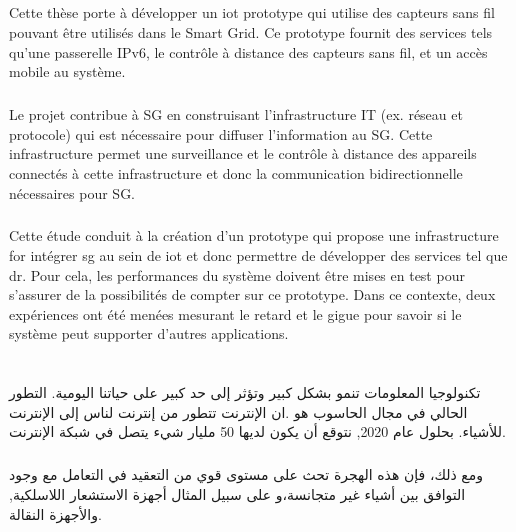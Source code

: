 \documentclass[12pt,a4paper,final]{report}
\begin{document}
\paragraph{} 
Cette thèse porte à développer un \gls{iot} prototype qui utilise des capteurs sans fil pouvant être utilisés dans le Smart Grid. Ce prototype fournit des services tels qu'une passerelle IPv6, le contrôle à distance des capteurs sans fil, et un accès mobile au système.
\paragraph{}
Le projet contribue à SG en construisant l'infrastructure IT (ex. réseau et protocole) qui est nécessaire pour diffuser l'information au SG. Cette infrastructure permet une surveillance et le contrôle à distance des appareils connectés à cette infrastructure et donc la communication bidirectionnelle nécessaires pour SG.
\paragraph{}
Cette étude conduit à la création d'un prototype qui propose une infrastructure for intégrer \gls{sg} au sein de \gls{iot} et donc permettre de développer des services tel que \gls{dr}. Pour cela, les performances du système doivent être mises en test pour s'assurer de la possibilités de compter sur ce prototype. Dans ce contexte, deux expériences ont été menées mesurant le retard et le gigue pour savoir si le système peut supporter d'autres applications.


\chapter*{}
\paragraph{}
\begin{arabtex}
تكنولوجيا المعلومات تنمو بشكل كبير وتؤثر إلى حد كبير على حياتنا اليومية. التطور الحالي في مجال الحاسوب هو  .ان الإنترنت تتطور من إنترنت لناس إلى الإنترنت  للأشياء. بحلول عام 2020, نتوقع أن يكون لديها 50 مليار شيء يتصل في شبكة الإنترنت.
\end{arabtex}
\paragraph{}
\begin{arabtex}
ومع ذلك، فإن هذه الهجرة تحث على مستوى قوي من التعقيد في التعامل مع وجود التوافق بين أشياء غير متجانسة،و على سبيل المثال أجهزة الاستشعار اللاسلكية, والأجهزة النقالة.
\end{arabtex}
\end{document}
